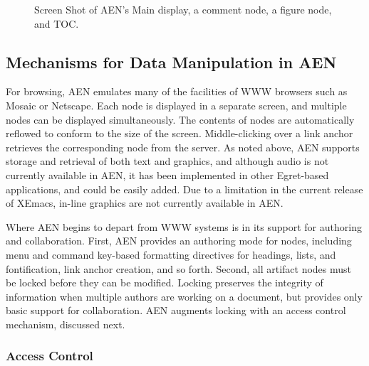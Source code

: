 \begin{figure}[htb]
 \centerline{}
 {}
 \caption{Screen Shot of AEN's Main display, a comment node, a figure node,
 and TOC.}
 \label{fig:Screen1}
\end{figure}


\subsection{Mechanisms for Data Manipulation in AEN}
\label{sec:mechanisms}

For browsing, AEN emulates many of the facilities of WWW browsers such as
Mosaic or Netscape.  Each node is displayed in a separate screen, and
multiple nodes can be displayed simultaneously.  The contents of nodes are
automatically reflowed to conform to the size of the screen.
Middle-clicking over a link anchor retrieves the corresponding node from
the server.  As noted above, AEN supports storage and retrieval of both
text and graphics, and although audio is not currently available in AEN, it
has been implemented in other Egret-based applications, and could be easily
added.  Due to a limitation in the current release of XEmacs, in-line
graphics are not currently available in AEN.

Where AEN begins to depart from WWW systems is in its support for
authoring and collaboration.  First, AEN provides an authoring mode
for nodes, including menu and command key-based formatting directives
for headings, lists, and fontification, link anchor creation, and so
forth.  Second, all artifact nodes must be locked before they can be
modified.  Locking preserves the integrity of information when
multiple authors are working on a document, but provides only basic
support for collaboration.  AEN augments locking with an access
control mechanism, discussed next.

\subsubsection{Access Control}

